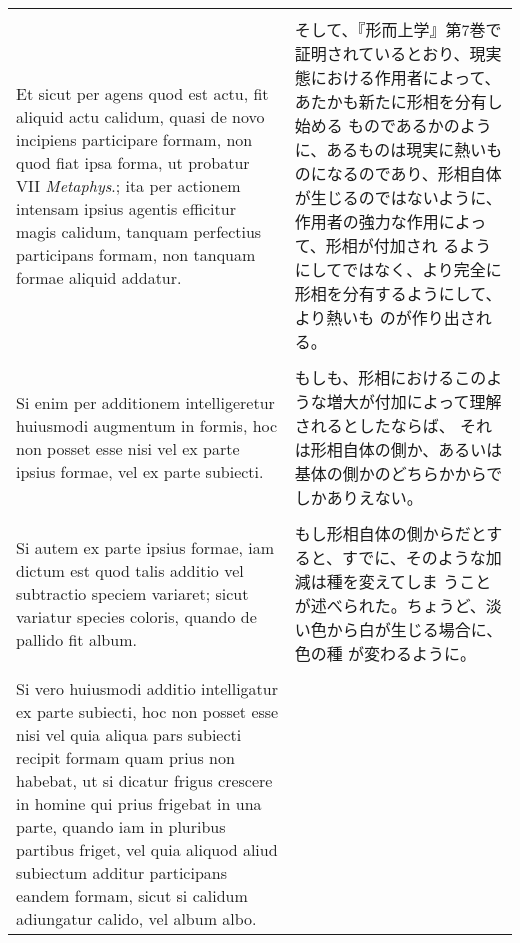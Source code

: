 \documentclass[10pt]{jsarticle} %
\begin{document}
\begin{longtable}{p{21em}p{21em}}
\\\\

Et sicut per agens quod est actu, fit aliquid actu calidum,
quasi de novo incipiens participare formam, non quod fiat ipsa forma,
ut probatur VII {\itshape Metaphys}.; ita per actionem intensam ipsius agentis
efficitur magis calidum, tanquam perfectius participans formam, non
tanquam formae aliquid addatur. 


&

そして、『形而上学』第7巻で証明されているとおり、現実態における作用者によって、あたかも新たに形相を分有し始める
ものであるかのように、あるものは現実に熱いものになるのであり、形相自体
 が生じるのではないように、作用者の強力な作用によって、形相が付加され
 るようにしてではなく、より完全に形相を分有するようにして、より熱いも
 のが作り出される。

\\\\

Si enim per additionem intelligeretur
huiusmodi augmentum in formis, hoc non posset esse nisi vel ex parte
ipsius formae, vel ex parte subiecti. 


&

もしも、形相におけるこのような増大が付加によって理解されるとしたならば、
それは形相自体の側か、あるいは基体の側かのどちらかからでしかありえない。

\\\\


Si autem ex parte ipsius formae,
iam dictum est quod talis additio vel subtractio speciem variaret;
sicut variatur species coloris, quando de pallido fit album. 


&

もし形相自体の側からだとすると、すでに、そのような加減は種を変えてしま
うことが述べられた。ちょうど、淡い色から白が生じる場合に、色の種
が変わるように。

\\\\


Si vero
huiusmodi additio intelligatur ex parte subiecti, hoc non posset esse
nisi vel quia aliqua pars subiecti recipit formam quam prius non
habebat, ut si dicatur frigus crescere in homine qui prius frigebat in
una parte, quando iam in pluribus partibus friget, vel quia aliquod
aliud subiectum additur participans eandem formam, sicut si calidum
adiungatur calido, vel album albo. 


&


\end{longtable}
\end{document}
